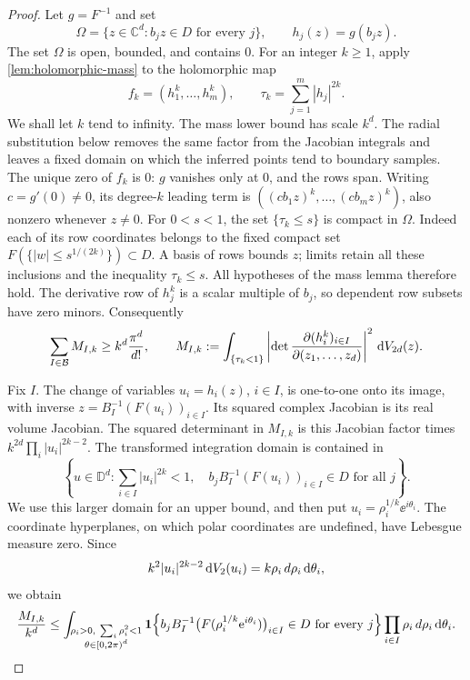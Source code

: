\begin{proof}
Let $g=F^{-1}$ and set
\[
 \Omega=\{z\in\mathbb{C}^d:b_jz\in D\text{ for every }j\},
 \qquad h_j(z)=g(b_jz).
\]
The set $\Omega$ is open, bounded, and contains $0$. For an integer $k\geq1$, apply \cref{lem:holomorphic-mass} to the holomorphic map
\[
 f_k=(h_1^k,\ldots,h_m^k),\qquad
 \tau_k=\sum_{j=1}^m|h_j|^{2k}.
\]
We shall let $k$ tend to infinity. The mass lower bound has scale $k^d$. The radial substitution below removes the same factor from the Jacobian integrals and leaves a fixed domain on which the inferred points tend to boundary samples. The unique zero of $f_k$ is $0$: $g$ vanishes only at $0$, and the rows span. Writing $c=g'(0)\ne0$, its degree-$k$ leading term is $((cb_1z)^k,\ldots,(cb_mz)^k)$, also nonzero whenever $z\ne0$. For $0<s<1$, the set $\{\tau_k\leq s\}$ is compact in $\Omega$. Indeed each of its row coordinates belongs to the fixed compact set $F(\{|w|\leq s^{1/(2k)}\})\subset D$. A basis of rows bounds $z$; limits retain all these inclusions and the inequality $\tau_k\leq s$. All hypotheses of the mass lemma therefore hold. The derivative row of $h_j^k$ is a scalar multiple of $b_j$, so dependent row subsets have zero minors. Consequently
\begin{equation}\label{eq:feasibility-mass}
 \sum_{I\in\mathcal{B}}M_{I,k}\geq
 k^d\frac{\pi^d}{d!},\qquad
 M_{I,k}:=\int_{\{\tau_k<1\}}
 \left|\det\frac{\partial(h_i^k)_{i\in I}}
                        {\partial(z_1,\ldots,z_d)}\right|^2\,\mathrm{d} V_{2d}(z).
\end{equation}

Fix $I$. The change of variables $u_i=h_i(z)$, $i\in I$, is one-to-one onto its image, with inverse $z=B_I^{-1}(F(u_i))_{i\in I}$. Its squared complex Jacobian is its real volume Jacobian. The squared determinant in $M_{I,k}$ is this Jacobian factor times $k^{2d}\prod_i|u_i|^{2k-2}$. The transformed integration domain is contained in
\[
 \left\{u\in\mathbb{D}^d:
       \sum_{i\in I}|u_i|^{2k}<1,\quad
       b_jB_I^{-1}(F(u_i))_{i\in I}\in D\text{ for all }j\right\}.
\]
We use this larger domain for an upper bound, and then put $u_i=\rho_i^{1/k}\ee^{i\theta_i}$. The coordinate hyperplanes, on which polar coordinates are undefined, have Lebesgue measure zero. Since
\[
 k^2|u_i|^{2k-2}\,\mathrm{d} V_2(u_i)
      =k\rho_i\,d\rho_i\,\mathrm{d} \theta_i,
\]
we obtain
\begin{equation}\label{eq:feasibility-radial}
 \frac{M_{I,k}}{k^d}\leq
 \int_{\substack{\rho_i>0,\ \sum_i\rho_i^2<1\\
                  \theta\in[0,2\pi)^d}}
 \mathbf1\!\left\{
  b_jB_I^{-1}\bigl(F(\rho_i^{1/k}\mathrm{e}^{i\theta_i})\bigr)_{i\in I}
                    \in D\text{ for every }j\right\}
 \prod_{i\in I}\rho_i\,d\rho_i\,\mathrm{d} \theta_i.
\end{equation}


\end{proof}
